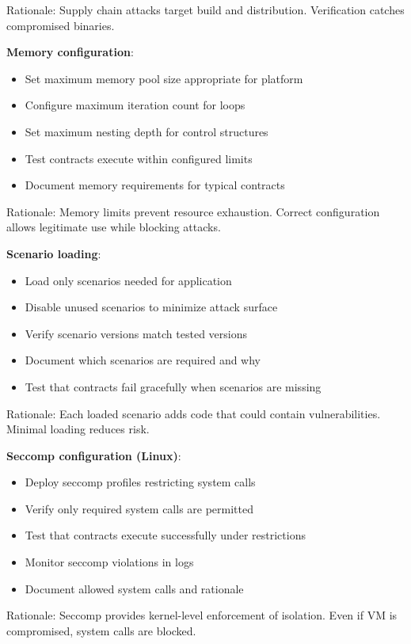 Rationale: Supply chain attacks target build and
distribution. Verification catches compromised binaries.

\textbf{Memory configuration}:

\begin{itemize}
\item Set maximum memory pool size appropriate for platform
\item Configure maximum iteration count for loops
\item Set maximum nesting depth for control structures
\item Test contracts execute within configured limits
\item Document memory requirements for typical contracts
\end{itemize}

Rationale: Memory limits prevent resource exhaustion. Correct
configuration allows legitimate use while blocking attacks.

\textbf{Scenario loading}:

\begin{itemize}
\item Load only scenarios needed for application
\item Disable unused scenarios to minimize attack surface
\item Verify scenario versions match tested versions
\item Document which scenarios are required and why
\item Test that contracts fail gracefully when scenarios are missing
\end{itemize}

Rationale: Each loaded scenario adds code that could contain
vulnerabilities. Minimal loading reduces risk.

\textbf{Seccomp configuration (Linux)}:

\begin{itemize}
\item Deploy seccomp profiles restricting system calls
\item Verify only required system calls are permitted
\item Test that contracts execute successfully under restrictions
\item Monitor seccomp violations in logs
\item Document allowed system calls and rationale
\end{itemize}

Rationale: Seccomp provides kernel-level enforcement of
isolation. Even if VM is compromised, system calls are blocked.

